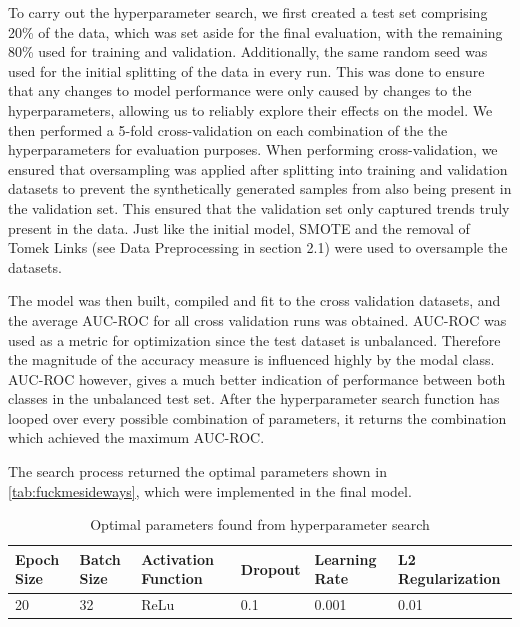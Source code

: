 \noindent
To carry out the hyperparameter search, we first created a test set comprising 20\% of the data, which was set aside for the final evaluation, with the remaining 80\% used for training and validation. Additionally, the same random seed was used for the initial splitting of the data in every run. This was done to ensure that any changes to model performance were only caused by changes to the hyperparameters, allowing us to reliably explore their effects on the model. We then performed a 5-fold cross-validation on each combination of the the hyperparameters for evaluation purposes. When performing cross-validation, we ensured that oversampling was applied after splitting into training and validation datasets to prevent the synthetically generated samples from also being present in the validation set. This ensured that the validation set only captured trends truly present in the data. Just like the initial model, SMOTE and the removal of Tomek Links (see Data Preprocessing in section 2.1) were used to oversample the datasets. 

The model was then built, compiled and fit to the cross validation datasets, and the average AUC-ROC for all cross validation runs was obtained. AUC-ROC was used as a metric for optimization since the test dataset is unbalanced. Therefore the magnitude of the accuracy measure is influenced highly by the modal class. AUC-ROC however, gives a much better indication of performance between both classes in the unbalanced test set. After the hyperparameter search function has looped over every possible combination of parameters, it returns the combination which achieved the maximum AUC-ROC.

The search process returned the optimal parameters shown in \autoref{tab:fuckmesideways}, which were implemented in the final model.


\begin{table}[H]
\begin{tabular}{|l|l|l|l|l|l|}
\hline
\rowcolor[HTML]{EFEFEF} 
\textbf{Epoch Size} & \textbf{Batch Size} & \textbf{Activation Function} & \textbf{Dropout} & \textbf{Learning Rate} & \textbf{L2 Regularization} \\ \hline
20                  & 32                  & ReLu                         & 0.1              & 0.001                  & 0.01                       \\ \hline
\end{tabular}
\caption[Result of Hyperparameter Search]{Optimal parameters found from hyperparameter search}
\label{tab:fuckmesideways}
\end{table}










